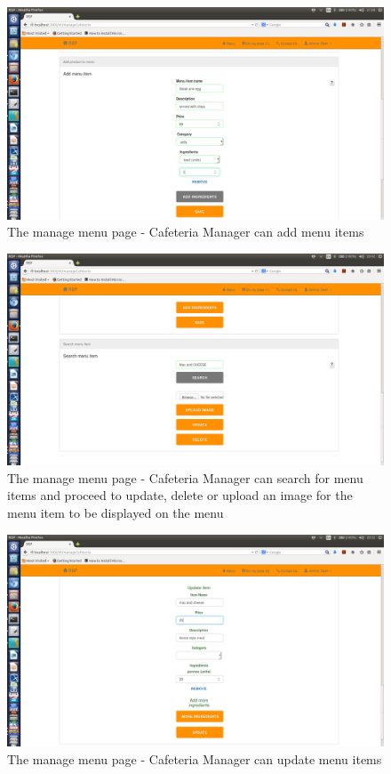 \documentclass[a4paper,12pt]{report}
\begin{document}
\begin{figure}[H]
  \centering
    \includegraphics[width=1.0\textwidth]{screenshots/addMenu.png}
    \caption{The manage menu page - Cafeteria Manager can add menu items}
\end{figure}

\begin{figure}[H]
  \centering
    \includegraphics[width=1.0\textwidth]{screenshots/searchMenuItem.png}
    \caption{The manage menu page - Cafeteria Manager can search for menu items and proceed to update, delete or upload an image for the menu item to be displayed on the menu}
\end{figure}

\begin{figure}[H]
  \centering
    \includegraphics[width=1.0\textwidth]{screenshots/updateMenu.png}
    \caption{The manage menu page - Cafeteria Manager can update menu items}
\end{figure}
\end{document}
